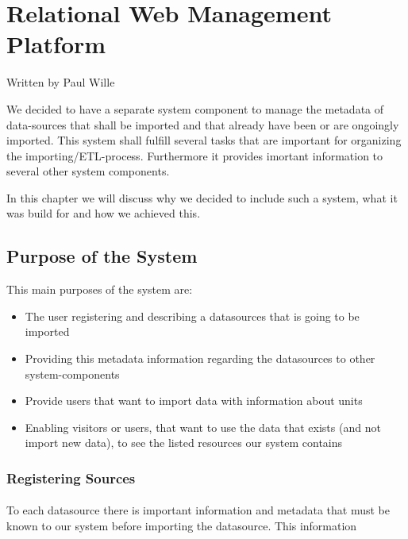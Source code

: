 \section{Relational Web Management
	Platform}\label{relational-web-management-platform}

Written by Paul Wille

We decided to have a separate system component to manage the metadata of
data-sources that shall be imported and that already have been or are
ongoingly imported. This system shall fulfill several tasks that are
important for organizing the importing/ETL-process. Furthermore it
provides imortant information to several other system components.

In this chapter we will discuss why we decided to include such a system,
what it was build for and how we achieved this.

\subsection{Purpose of the System}\label{purpose-of-the-system}

This main purposes of the system are:

\begin{itemize}
	\item
	The user registering and describing a datasources that is going to be
	imported
	\item
	Providing this metadata information regarding the datasources to other
	system-components
	\item
	Provide users that want to import data with information about units
	\item
	Enabling visitors or users, that want to use the data that exists (and
	not import new data), to see the listed resources our system contains
\end{itemize}



\subsubsection{Registering Sources}\label{registering-sources}

\paragraph{}
To each datasource there is important information and metadata that must
be known to our system before importing the datasource. This information

